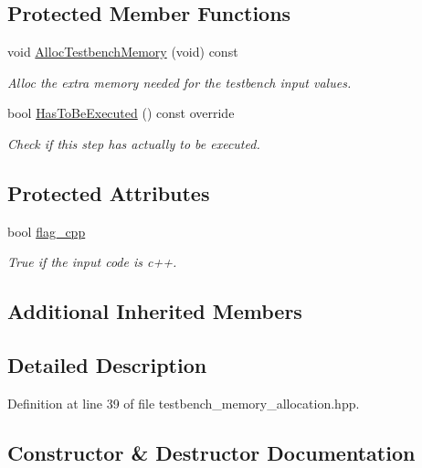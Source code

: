 \subsection*{Protected Member Functions}
\begin{DoxyCompactItemize}
\item 
void \hyperlink{classTestbenchMemoryAllocation_a3575bb53a3cd98bce82a358a8e506aca}{Alloc\+Testbench\+Memory} (void) const
\begin{DoxyCompactList}\small\item\em Alloc the extra memory needed for the testbench input values. \end{DoxyCompactList}\item 
bool \hyperlink{classTestbenchMemoryAllocation_a5546b24f116a6d0b3cba059d096ab2c6}{Has\+To\+Be\+Executed} () const override
\begin{DoxyCompactList}\small\item\em Check if this step has actually to be executed. \end{DoxyCompactList}\end{DoxyCompactItemize}
\subsection*{Protected Attributes}
\begin{DoxyCompactItemize}
\item 
bool \hyperlink{classTestbenchMemoryAllocation_a1f1b101b3a8c2ba4738a1a733b9cd0bd}{flag\+\_\+cpp}
\begin{DoxyCompactList}\small\item\em True if the input code is c++. \end{DoxyCompactList}\end{DoxyCompactItemize}
\subsection*{Additional Inherited Members}


\subsection{Detailed Description}


Definition at line 39 of file testbench\+\_\+memory\+\_\+allocation.\+hpp.



\subsection{Constructor \& Destructor Documentation}
\mbox{\label{classTestbenchMemoryAllocation_ac8c474eff29721aced9a039fa2b162bd}} 
